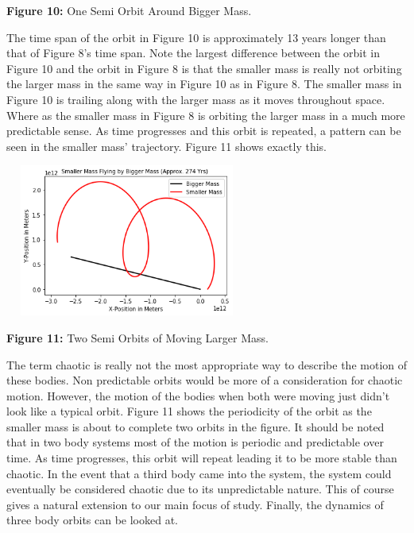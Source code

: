 \documentclass[]{article}
\begin{document}
\begin{multicols}{2}
\begin{center}
\caption{\small{\textbf{Figure 10:}} \tiny{One Semi Orbit Around Bigger Mass.}}
\end{center}
The time span of the orbit in Figure 10 is approximately 13 years longer than that of Figure 8's time span. Note the largest difference between the orbit in Figure 10 and the orbit in Figure 8 is that the smaller mass is really not orbiting the larger mass in the same way in Figure 10 as in Figure 8. The smaller mass in Figure 10 is trailing along with the larger mass as it moves throughout space. Where as the smaller mass in Figure 8 is orbiting the larger mass in a much more predictable sense. As time progresses and this orbit is repeated, a pattern can be seen in the smaller mass' trajectory. Figure 11 shows exactly this.
\begin{center}
\includegraphics[width=8cm, height=5cm]{PHYS 342 FP 2-Body Fly By (5).png}
\caption{\small{\textbf{Figure 11:}} \tiny{Two Semi Orbits of Moving Larger Mass.}}
\end{center}
The term chaotic is really not the most appropriate way to describe the motion of these bodies. Non predictable orbits would be more of a consideration for chaotic motion. However, the motion of the bodies when both were moving just didn't look like a typical orbit. Figure 11 shows the periodicity of the orbit as the smaller mass is about to complete two orbits in the figure. It should be noted that in two body systems most of the motion is periodic and predictable over time. As time progresses, this orbit will repeat leading it to be more stable than chaotic. In the event that a third body came into the system, the system could eventually be considered chaotic due to its unpredictable nature. This of course gives a natural extension to our main focus of study. Finally, the dynamics of three body orbits can be looked at.
\par
\end{multicols}
\end{document}
